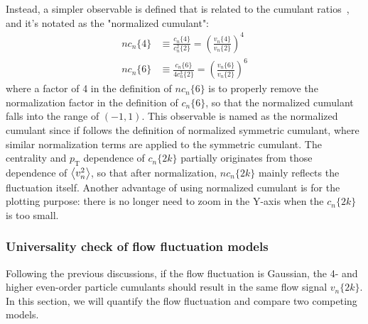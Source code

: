 Instead, a simpler observable is defined that is related to the cumulant ratios~\cite{Sirunyan:2017fts}, and it's notated as the "normalized cumulant":
\begin{equation}
\begin{split}
nc_n\{4\}&\equiv\frac{c_n\{4\}}{c_n^2\{2\}} = (\frac{v_n\{4\}}{v_n\{2\}})^4 \\
nc_n\{6\}&\equiv\frac{c_n\{6\}}{4c_n^3\{2\}} = (\frac{v_n\{6\}}{v_n\{2\}})^6
\end{split}
\end{equation}
where a factor of 4 in the definition of $nc_n\{6\}$ is to properly remove the normalization factor in the definition of $c_n\{6\}$, so that the normalized cumulant falls into the range of $(-1,1)$. This observable is named as the normalized cumulant since if follows the definition of normalized symmetric cumulant, where similar normalization terms are applied to the symmetric cumulant. The centrality and $p_\text{T}$ dependence of $c_n\{2k\}$ partially originates from those dependence of $\left\langle v_n^2\right\rangle$, so that after normalization, $nc_n\{2k\}$ mainly reflects the fluctuation itself. Another advantage of using normalized cumulant is for the plotting purpose: there is no longer need to zoom in the Y-axis when the $c_{n}\{2k\}$ is too small.



\subsubsection{Universality check of flow fluctuation models}
Following the previous discussions, if the flow fluctuation is Gaussian, the 4- and higher even-order particle cumulants should result in the same flow signal $v_{n}\{2k\}$. In this section, we will quantify the flow fluctuation and compare two competing models.~\cite{Yan:2013laa}


